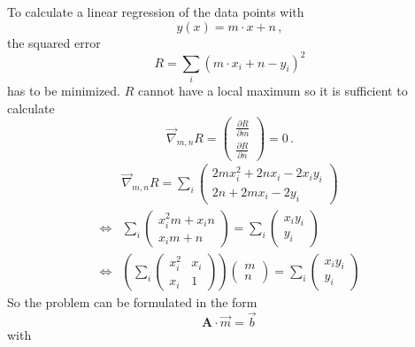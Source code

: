 To calculate a linear regression of the data points with
\begin{equation}
    y(x) = m \cdot x + n \, ,
\end{equation}
the squared error
\begin{equation}
    R = \sum_i (m \cdot x_i + n - y_i)^2
\end{equation}
has to be minimized.
$R$ cannot have a local maximum so it is sufficient to calculate
\begin{equation}
    \vec{\nabla}_{m,n} R = 
    \begin{pmatrix}
        \frac{\partial R}{\partial m} \\
        \frac{\partial R}{\partial n}
    \end{pmatrix}
    = 0 \, .
\end{equation}
\begin{align*}
    & \vec{\nabla}_{m,n} R = \sum_i 
    \begin{pmatrix}
        2 m x_i^2 + 2 n x_i - 2 x_i y_i \\
        2 n + 2 m x_i - 2 y_i
    \end{pmatrix} \\
    \Leftrightarrow & \sum_i 
    \begin{pmatrix}
        x_i^2 m + x_i n \\
        x_i m + n
    \end{pmatrix} = \sum_i 
    \begin{pmatrix}
        x_i y_i \\
        y_i
    \end{pmatrix} \\
    \Leftrightarrow & \left( \sum_i 
    \begin{pmatrix}
        x_i^2 & x_i \\
        x_i & 1
    \end{pmatrix} \right) 
    \begin{pmatrix}
        m \\
        n
    \end{pmatrix} = \sum_i 
    \begin{pmatrix}
        x_i y_i \\
        y_i
    \end{pmatrix}
\end{align*}
So the problem can be formulated in the form
\begin{equation}
    \label{eq:system}
    \symbf{A} \cdot \vec{m} = \vec{b} \, 
\end{equation}
with

